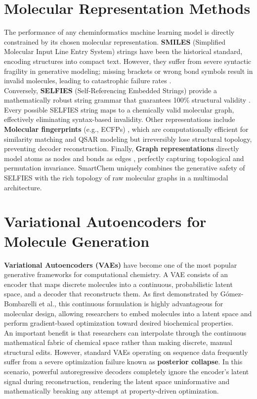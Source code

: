 \documentclass[12pt,a4paper]{report}
\begin{document}
\section{Molecular Representation Methods}

The performance of any cheminformatics machine learning model is directly constrained by its chosen molecular representation. \textbf{SMILES} (Simplified Molecular Input Line Entry System) strings have been the historical standard, encoding structures into compact text. However, they suffer from severe syntactic fragility in generative modeling; missing brackets or wrong bond symbols result in invalid molecules, leading to catastrophic failure rates \cite{gomez2018}.\\

Conversely, \textbf{SELFIES} (Self-Referencing Embedded Strings) provide a mathematically robust string grammar that guarantees 100\% structural validity \cite{krenn2020}. Every possible SELFIES string maps to a chemically valid molecular graph, effectively eliminating syntax-based invalidity. Other representations include \textbf{Molecular fingerprints} (e.g., ECFPs) \cite{rogers2010}, which are computationally efficient for similarity matching and QSAR modeling but irreversibly lose structural topology, preventing decoder reconstruction. Finally, \textbf{Graph representations} directly model atoms as nodes and bonds as edges \cite{gilmer2017}, perfectly capturing topological and permutation invariance. SmartChem uniquely combines the generative safety of SELFIES with the rich topology of raw molecular graphs in a multimodal architecture.

\section{Variational Autoencoders for Molecule Generation}

\textbf{Variational Autoencoders (VAEs)} have become one of the most popular generative frameworks for computational chemistry. A VAE consists of an encoder that maps discrete molecules into a continuous, probabilistic latent space, and a decoder that reconstructs them. As first demonstrated by Gómez-Bombarelli et al., this continuous formulation is highly advantageous for molecular design, allowing researchers to embed molecules into a latent space and perform gradient-based optimization toward desired biochemical properties.\\

An important benefit is that researchers can interpolate through the continuous mathematical fabric of chemical space rather than making discrete, manual structural edits. However, standard VAEs operating on sequence data frequently suffer from a severe optimization failure known as \textbf{posterior collapse}. In this scenario, powerful autoregressive decoders completely ignore the encoder's latent signal during reconstruction, rendering the latent space uninformative and mathematically breaking any attempt at property-driven optimization. 
\end{document}

